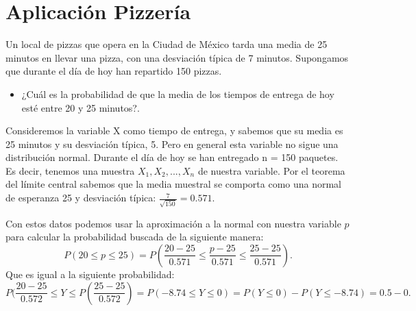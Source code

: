 \documentclass[]{article}
\begin{document}
\section{Aplicación Pizzería}
Un local de pizzas que opera en la Ciudad de México tarda una media de 25 minutos en llevar una pizza,
con una desviación típica de 7 minutos. Supongamos que durante el día de hoy han repartido 150
pizzas.
\begin{itemize}
	\item ¿Cuál es la probabilidad de que la media de los tiempos de entrega de hoy esté entre 20 y 25 minutos?.
\end{itemize}
Consideremos la variable X como tiempo de entrega, 
y sabemos que su media es 25 minutos y su
desviación típica, 5. Pero en general esta variable no sigue una distribución normal.
Durante el día de hoy se han entregado n = 150 paquetes. Es decir, tenemos una muestra $X_{1}, X_{2}, ..., X_{n}$ de nuestra
variable.
Por el teorema del límite central sabemos que la media muestral se comporta como una normal de
esperanza 25 y desviación típica:
$\frac{7}{\sqrt{150}} = 0.571.$

Con estos datos podemos usar la  aproximación a la normal con nuestra variable $p$ para calcular la probabilidad buscada de la siguiente manera:
\[ P(20 \leq p \leq 25) = P(\frac{20-25}{0.571} \leq \frac{p-25}{0.571} \leq \frac{25-25}{0.571}).\]
Que es igual a la siguiente probabilidad:
\[ P(\frac{20-25}{0.572} \leq Y \leq P(\frac{25-25}{0.572}) = P(-8.74 \leq Y \leq 0) = P(Y \leq 0) - P(Y \leq -8.74) = 0.5 - 0.\]

\printbibliography[title={Referencias}]
\end{document}
